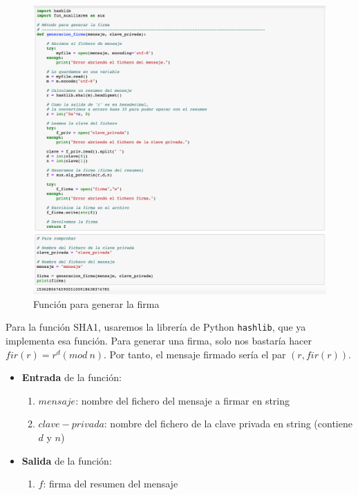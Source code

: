 \documentclass{manual}
\begin{document}
\begin{figure}[H]
	\centering
	\includegraphics[width=145mm]{images/2}
	\caption{Función para generar la firma} 
\end{figure}

Para la función SHA1, usaremos la librería de Python \texttt{hashlib}, que ya implementa esa función. Para generar una firma, solo nos bastaría hacer $fir(r) = r^d (mod\ n)$. Por tanto, el mensaje firmado sería el par $(r, fir(r))$.

\begin{itemize}
	\item \textbf{Entrada} de la función: 
	\begin{enumerate}
		\item $mensaje$: nombre del fichero del mensaje a firmar en string
		\item $clave-privada$: nombre del fichero de la clave privada en string (contiene $d$ y $n$)
	\end{enumerate}
	
	\item \textbf{Salida} de la función: 
	\begin{enumerate}
		\item $f$: firma del resumen del mensaje
	\end{enumerate}
\end{itemize}	
\end{document}
